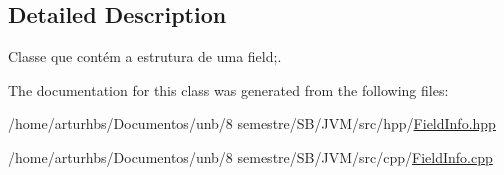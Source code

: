 \subsection{Detailed Description}
Classe que contém a estrutura de uma field;. 

The documentation for this class was generated from the following files\+:\begin{DoxyCompactItemize}
\item 
/home/arturhbs/\+Documentos/unb/8 semestre/\+S\+B/\+J\+V\+M/src/hpp/\hyperlink{FieldInfo_8hpp}{Field\+Info.\+hpp}\item 
/home/arturhbs/\+Documentos/unb/8 semestre/\+S\+B/\+J\+V\+M/src/cpp/\hyperlink{FieldInfo_8cpp}{Field\+Info.\+cpp}\end{DoxyCompactItemize}
